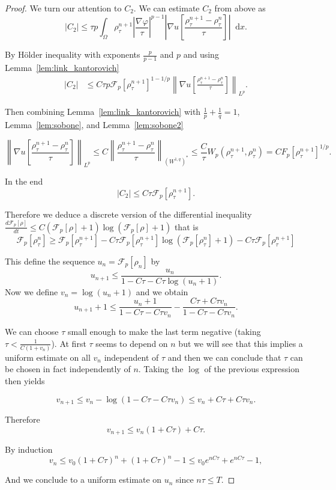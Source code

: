 \documentclass[a4paper,twosided, 11pt]{article}
\newcommand {\f}   {\frac}
\theoremstyle{plain}
\theoremstyle{remark}
\newcommand{\diff}{\mathop{}\!\mathrm{d}}
\numberwithin{equation}{section}
\begin{document}
\begin{proof}
We turn our attention to $C_2$. We can estimate $C_2$ from above as
$$
|C_2| \le \tau p\int_{\Omega} \rho^{n+1}_{\tau} \left|\f{\nabla\varphi}{\tau}\right|^{p-1} \left|\nabla u\left[\f{\rho^{n+1}_{\tau}-\rho^{n}_{\tau}}{\tau}\right]\right|\diff x.
$$

By Hölder inequality with exponents $\f{p}{p-1}$ and $p$ and using Lemma~\ref{lem:link_kantorovich}
\begin{align*}
|C_2| &\le C \tau p \mathcal{F}_{p}[\rho^{n+1}_{\tau}]^{1-1/p}\left\|\nabla u\left[\f{\rho^{n+1}_{\tau}-\rho^{n}_{\tau}}{\tau}\right]\right\|_{L^{p}}. 
\end{align*}

Then combining Lemma~\ref{lem:link_kantorovich} with $\f{1}{p} + \f{1}{q}=1$, Lemma~\ref{lem:sobone}, and Lemma~\ref{lem:sobone2} 

$$
\left\|\nabla u\left[\f{\rho^{n+1}_{\tau}-\rho^{n}_{\tau}}{\tau}\right]\right\|_{L^{p}} \le C\left\|\f{\rho^{n+1}_{\tau}-\rho^{n}_{\tau}}{\tau}\right\|_{(W^{1,q})^*}\le \f{C}{\tau} W_{p}(\rho^{n+1}_{\tau},\rho^{n}_{\tau}) = CF_{p}[\rho^{n+1}_{\tau}]^{1/p}.
$$

In the end
$$
|C_2|\le C\tau \mathcal{F}_p[\rho^{n+1}_{\tau}].
$$

Therefore we deduce a discrete version of the differential inequality $\f{d\mathcal{F}_{p}[\rho]}{dt}\le C(\mathcal{F}_{p}[\rho]+1)\log(\mathcal{F}_{p}[\rho]+1)$ that is
$$
\mathcal{F}_p[\rho^{n}_{\tau}]\ge \mathcal{F}_p[\rho^{n+1}_{\tau}] -C\tau \mathcal{F}_p[\rho^{n+1}_{\tau}]\log(\mathcal{F}_p[\rho^{n}_{\tau}]+1) - C\tau \mathcal{F}_p[\rho^{n+1}_{\tau}]
$$

This define the sequence $u_n = \mathcal{F}_{p}[\rho_n]$ by
$$
u_{n+1}\le \f{u_n}{1-C\tau-C\tau \log(u_n+1)}.
$$
Now we define $v_n = \log(u_n +1)$ and we obtain 
$$
u_{n+1}+1\le \f{u_n+1}{1-C\tau-C\tau v_n} -\f{C\tau + C\tau v_n}{1-C\tau-C\tau v_n}. 
$$

We can choose $\tau$ small enough to make the last term negative (taking $\tau< \f{1}{C(1+v_n)}$). At first $\tau$ seems to depend on $n$ but we will see that this implies a uniform estimate on all $v_n$ independent of $\tau$ and then we can conclude that $\tau$ can be chosen in fact independently of $n$. Taking the $\log$ of the previous expression then yields

$$
v_{n+1}\le v_n - \log(1-C\tau-C\tau v_n)\le v_n + C\tau + C\tau v_n.
$$

Therefore
$$
v_{n+1} \le  v_n(1+C\tau)+ C\tau.
$$

By induction 
$$
v_{n}\le v_{0}(1+C\tau)^{n} + (1+C\tau)^n-1\le v_{0} e^{nC\tau}+e^{nC\tau}-1,
$$

And we conclude to a uniform estimate on $u_n$ since $n\tau\le T$. 

\end{proof}
\end{document}

